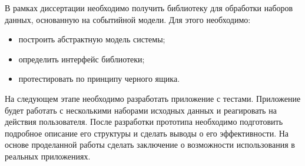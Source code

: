 В рамках диссертации необходимо получить библиотеку для обработки наборов данных, основанную на событийной модели.
Для этого необходимо:
\begin{itemize}
  \item построить абстрактную модель системы;
  \item определить интерфейс библиотеки;
  \item протестировать по принципу черного ящика.
\end{itemize}

На следующем этапе необходимо разработать приложение с тестами.
Приложение будет работать с несколькими наборами исходных данных и реагировать на действия пользователя.
После разработки прототипа необходимо подготовить подробное описание его структуры и сделать выводы о его эффективности.
На основе проделанной работы сделать заключение о возможности использования в реальных приложениях.
